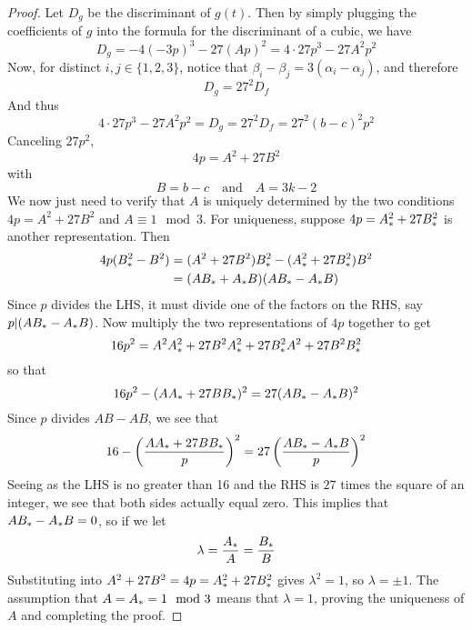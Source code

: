 \begin{proof}
Let $D_g$ be the discriminant of $g(t)$. Then by simply plugging the coefficients of $g$ into the formula for the discriminant of a cubic, we have
$$D_g = -4(-3p)^3 - 27(Ap)^2 = 4 \cdot 27p^3 - 27A^2p^2$$
Now, for distinct $i,j \in \{1,2,3\}$, notice that $\beta_i - \beta_j = 3(\alpha_i - \alpha_j)$, and therefore
$$D_g = 27^2 D_f$$
And thus
$$4 \cdot 27p^3 - 27A^2p^2 = D_g = 27^2 D_f = 27^2 (b-c)^2p^2$$
Canceling $27p^2$,
$$4p = A^2 + 27B^2$$
with
$$B = b-c\quad \text{and}\quad A = 3k-2$$
We now just need to verify that $A$ is uniquely determined by the two conditions $4p = A^2 + 27B^2$ and $A \equiv 1 \mod 3$.
For uniqueness, suppose $4p = {A}_{\ast}^2 + 27{B}_{\ast}^2$ is another representation. Then
\begin{align*}
	4p(B_\ast^2 - B^2) &= (A^2 + 27B^2){B}_{\ast}^2 - ({A}_{\ast}^2 + 27{B}_{\ast}^2)B^2\\
	&= (A{B}_{\ast} + {A}_{\ast}B)(A{B}_{\ast} - {A}_{\ast}B)
\end{align*}
Since $p$ divides the LHS, it must divide one of the factors on the RHS, say $p|(A{B}_{\ast} - {A}_{\ast}B)$. Now multiply the two representations of $4p$ together to get
$$16p^2 = A^2{A}_{\ast}^2 + 27B^2{A}_{\ast}^2 + 27{B}_{\ast}^2A^2 + 27B^2{B}_{\ast}^2$$
so that
$$16p^2 - (A{A}_{\ast} + 27B{B}_{\ast})^2 = 27(A{B}_{\ast} - {A}_{\ast}B)^2$$
Since $p$ divides $AB - AB$, we see that
$$16 - \left(\frac{A{A}_{\ast} + 27B{B}_{\ast}}{p}\right)^2 = 27\left(\frac{A{B}_{\ast}-{A}_{\ast}B}{p}\right)^2$$
Seeing as the LHS is no greater than 16 and the RHS is $27$ times the square of an integer, we see that both sides actually equal zero. This implies that $A{B}_{\ast} - {A}_{\ast}B = 0$, so if we let
$$\lambda = \frac{{A}_{\ast}}{A} = \frac{{B}_{\ast}}{B}$$
Substituting into $A^2 + 27B^2 = 4p = {A}_{\ast}^2 + 27{B}_{\ast}^2$ gives $\lambda^2 = 1$, so $\lambda = \pm 1$. The assumption that $A = {A}_{\ast} = 1 \mod 3$ means that $\lambda = 1$, proving the uniqueness of $A$ and completing the proof.
\end{proof}

